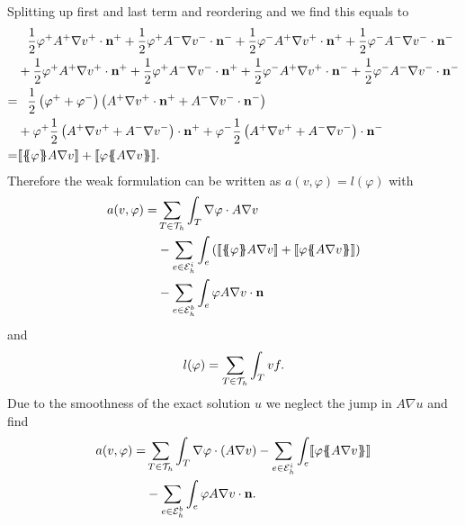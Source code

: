 Splitting up first and last term and reordering and we find this equals to
\begin{align*}
		 & \phantom{+} \frac 1 2 \varphi^+ A^+ \nabla v^+ \cdot \mathbf n^+ 
		     + \frac 1 2  \varphi^+ A^- \nabla v^- \cdot \mathbf n^- + \frac 1 2  \varphi^- A^+ \nabla v^+ \cdot \mathbf n^+ + \frac 1 2 \varphi^- A^- \nabla v^- \cdot \mathbf n^- \\
		& + \frac 1 2  \varphi^+ A^+ \nabla v^+ \cdot \mathbf n^+  + \frac 1 2 \varphi^+ A^- \nabla v^- \cdot \mathbf n^+ +\frac 1 2 \varphi^- A^+ \nabla v^+ \cdot \mathbf n^- + \frac 1 2 \varphi^- A^- \nabla v^- \cdot \mathbf n^-\\
		    	  = & \phantom{+} \frac 1 2 \left(\varphi^+ + \varphi^- \right) \left(A^+ \nabla v^+ \cdot \mathbf n^+ + A^- \nabla v^- \cdot \mathbf n^- \right) \\
  &+  \varphi^+ \frac 1 2  \left(A^+ \nabla v^+ + A^- \nabla v^-\right) \cdot \mathbf n^+ + \varphi^- \frac 1 2 \left(A^+ \nabla v^+ + A^- \nabla v^-\right) \cdot \mathbf n^- \\
  = &  \jump {\average \varphi  A \nabla v}+ \jump {\varphi \average{ A \nabla v}}.
\end{align*}
Therefore the weak formulation can be written as $a(v,\varphi) = l(\varphi)$ with 
\begin{align*}
  a(v, \varphi) = & \sum\limits_{T \in \triang} \int_T \nabla \varphi \cdot A \nabla v \\
	& - \sum\limits_{e \in \edgesi}\int_{e} \left( \jump {\average \varphi A \nabla v} + \jump {\varphi \average{ A \nabla v}} \right)\\
& - \sum\limits_{e \in \edgesb}\int_{e} \varphi A \nabla v \cdot \mathbf n
\end{align*}
and
\[
l(\varphi) = \sum_{T \in \mathcal{T}_h} \int_T v f.
\]
Due to the smoothness of the exact solution $u$ we neglect the jump in $A \nabla u$ and find
\begin{align*}
 a(v, \varphi) = & \sum\limits_{T \in \triang} \int_T \nabla \varphi \cdot \left(A \nabla v\right) %
	- \sum\limits_{e \in \edgesi} \int _e\jump{ \varphi \average{ A \nabla v}} %
	\\
& - \sum\limits_{e \in \edgesb}\int_{e} \varphi A \nabla v \cdot \mathbf n.
\end{align*}


